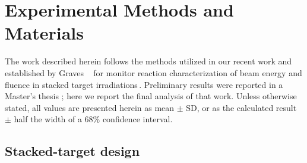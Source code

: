 \section{\label{sec:experimental_fe}Experimental Methods and Materials}


The work described herein follows the  methods utilized in our recent work and established by Graves \etal\ 
for monitor reaction characterization of beam energy and fluence in stacked target irradiations\,\cite{Voyles2018a,Graves2016}.
% 
% 
% 
Preliminary results  were reported in a Master's thesis \cite{springer2017investigation}; here we report the final analysis of that work.
Unless otherwise stated, all values are presented herein as mean $\pm$ SD, or as the calculated result $\pm$ half the width of a 68\% confidence interval.



\subsection{\label{sec:target_design_fe}Stacked-target design}

